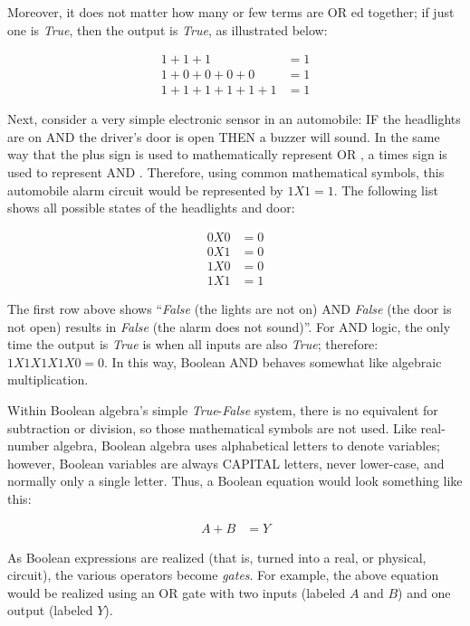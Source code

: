 Moreover, it does not matter how many or few terms are \textsf{OR} ed together; if just one is \emph{True}, then the output is \emph{True}, as illustrated below:

\begin{align}
  \label{04eq02}
  1 + 1 + 1 &= 1 \\
  \nonumber
  1 + 0 + 0 + 0 + 0 &= 1 \\
  \nonumber
  1 + 1 + 1 + 1 + 1 + 1 &= 1
\end{align}

Next, consider a very simple electronic sensor in an automobile: IF the headlights are on AND the driver's door is open THEN a buzzer will sound. In the same way that the plus sign is used to mathematically represent \textsf{OR} , a times sign is used to represent \textsf{AND} . Therefore, using common mathematical symbols, this automobile alarm circuit would be represented by $ 1 X 1 = 1 $. The following list shows all possible states of the headlights and door:

\begin{align}
  \label{04eq03}
  0 X 0 &= 0 \\
  \nonumber
  0 X 1 &= 0 \\
  \nonumber
  1 X 0 &= 0 \\
  \nonumber
  1 X 1 &= 1
\end{align}

The first row above shows ``\emph{False} (the lights are not on) AND \emph{False} (the door is not open) results in \emph{False} (the alarm does not sound)''. For \textsf{AND}  logic, the only time the output is \emph{True} is when all inputs are also \emph{True}; therefore: $ 1 X 1 X 1 X 1 X 0 = 0 $. In this way, Boolean \textsf{AND}  behaves somewhat like algebraic multiplication.

Within Boolean algebra's simple \emph{True}-\emph{False} system, there is no equivalent for subtraction or division, so those mathematical symbols are not used. Like real-number algebra, Boolean algebra uses alphabetical letters to denote variables; however, Boolean variables are always CAPITAL letters, never lower-case, and normally only a single letter. Thus, a Boolean equation would look something like this:

\begin{align}
  \label{04eq04}
  A + B &= Y 
\end{align}

As Boolean expressions are realized (that is, turned into a real, or physical, circuit), the various operators become \emph{gates}. For example, the above equation would be realized using an \textsf{OR}  gate with two inputs (labeled $ A $ and $ B $) and one output (labeled $ Y $). 

